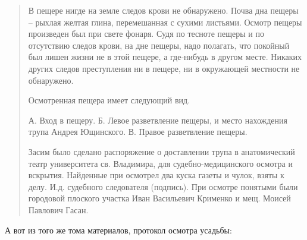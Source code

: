 \begin{quotation}
В пещере нигде на земле следов крови не обнаружено. Почва дна пещеры – рыхлая желтая глина, перемешанная с сухими листьями. Осмотр пещеры произведен был при свете фонаря. Судя по тесноте пещеры и по отсутствию следов крови, на дне пещеры, надо полагать, что покойный был лишен жизни не в этой пещере, а где-нибудь в другом месте. Никаких других следов преступления ни в пещере, ни в окружающей местности не обнаружено. 

Осмотренная пещера имеет следующий вид.

А. Вход в пещеру. Б. Левое разветвление пещеры, и место нахождения трупа Андрея Ющинского. В. Правое разветвление пещеры.

Засим было сделано распоряжение о доставлении трупа в анатомический театр университета св. Владимира, для судебно-медицинского осмотра и вскрытия. Найденные при осмотрел два куска газеты и чулок, взяты к делу. И.д. судебного следователя (подпись). При осмотре понятыми были городовой плоского участка Иван Васильевич Крименко и мещ. Моисей Павлович Гасан.
\end{quotation}

А вот из того же тома материалов, протокол осмотра усадьбы:

